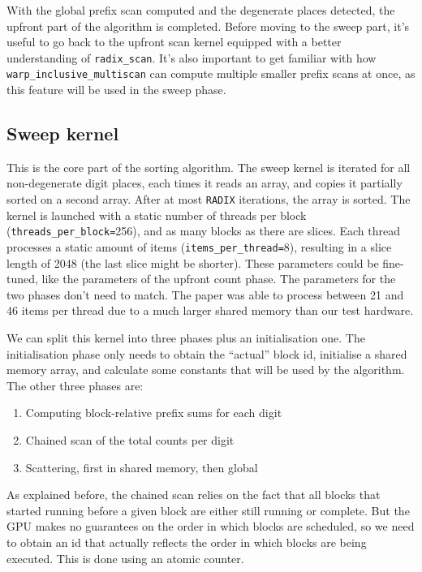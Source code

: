 \documentclass[a4paper]{report}
\begin{document}
With the global prefix scan computed and the degenerate places detected, the upfront part of the algorithm is completed. Before moving to the sweep part, it's useful to go back to the upfront scan kernel equipped with a better understanding of \lstinline{radix_scan}. It's also important to get familiar with how \lstinline{warp_inclusive_multiscan} can compute multiple smaller prefix scans at once, as this feature will be used in the sweep phase.

\subsection{Sweep kernel}

This is the core part of the sorting algorithm. The sweep kernel is iterated for all non-degenerate digit places, each times it reads an array, and copies it partially sorted on a second array. After at most \lstinline{RADIX} iterations, the array is sorted. The kernel is launched with a static number of threads per block (\lstinline{threads_per_block=}256), and as many blocks as there are slices. Each thread processes a static amount of items (\lstinline{items_per_thread=}8), resulting in a slice length of 2048 (the last slice might be shorter). These parameters could be fine-tuned, like the parameters of the upfront count phase. The parameters for the two phases don't need to match.
The paper was able to process between 21 and 46 items per thread due to a much larger shared memory than our test hardware.

We can split this kernel into three phases plus an initialisation one. The initialisation phase only needs to obtain the ``actual'' block id, initialise a shared memory array, and calculate some constants that will be used by the algorithm. The other three phases are:

\begin{enumerate}
  \item Computing block-relative prefix sums for each digit
  \item Chained scan of the total counts per digit
  \item Scattering, first in shared memory, then global
\end{enumerate}

As explained before, the chained scan relies on the fact that all blocks that started running before a given block are either still running or complete. But the GPU makes no guarantees on the order in which blocks are scheduled, so we need to obtain an id that actually reflects the order in which blocks are being executed. This is done using an atomic counter.
\end{document}
